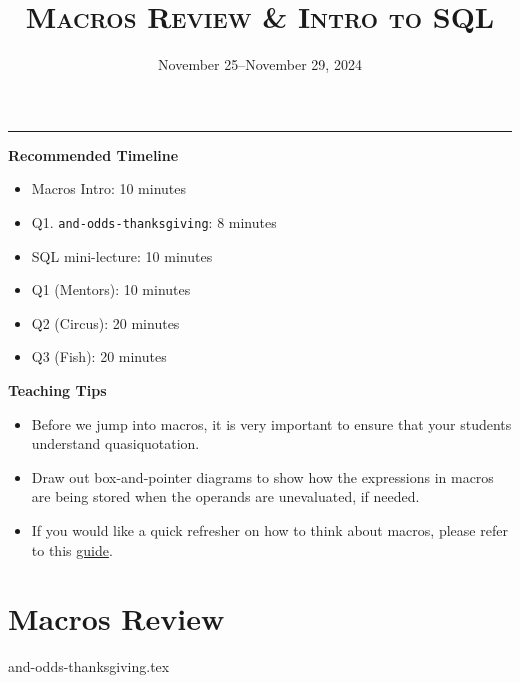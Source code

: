 \documentclass{exam}
\title{\textsc{Macros Review \& Intro to SQL}}
\date{November 25--November 29, 2024}
\begin{document}
\maketitle
\rule{\textwidth}{0.15em}

\begin{meta}
\begin{blocksection}
    \textbf{Recommended Timeline}
    \begin{itemize}
        \item Macros Intro: 10 minutes
        \item Q1. \lstinline{and-odds-thanksgiving}: 8 minutes
        \item SQL mini-lecture: 10 minutes
        \item Q1 (Mentors): 10 minutes
        \item Q2 (Circus): 20 minutes
        \item Q3 (Fish): 20 minutes
    \end{itemize}
\end{blocksection}
\vspace{5mm}
\end{meta}

\vspace{3mm}

\begin{meta}
\textbf{Teaching Tips}
\begin{itemize}
    \item Before we jump into macros, it is very important to ensure that your students understand quasiquotation.
    \item Draw out box-and-pointer diagrams to show how the expressions in macros are being stored when the operands are unevaluated, if needed.
    \item If you would like a quick refresher on how to think about macros, please refer to this \href{https://docs.google.com/document/d/1JSbvtJ5bYUEhovDZd_gQnBvkG_WDcafmX-4B3QeIXZU/edit}{guide}.
\end{itemize}
\end{meta}

\vspace{5mm}

\section{Macros Review}
\begin{questions}
{and-odds-thanksgiving.tex}
\newpage
\end{questions}
\end{document}
